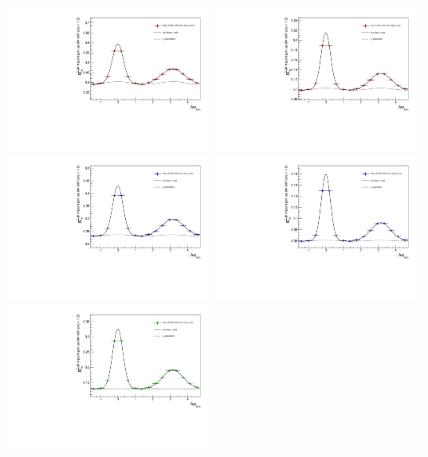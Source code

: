 \begin{figure}[ht]
    \centering
    \includegraphics[width=0.48\textwidth]{figures/analysis/h_h_dphi_von_0_20_lowpt.pdf}
    \includegraphics[width=0.48\textwidth]{figures/analysis/h_h_dphi_von_0_20_highpt.pdf}
    \includegraphics[width=0.48\textwidth]{figures/analysis/h_h_dphi_von_20_50_lowpt.pdf}
    \includegraphics[width=0.48\textwidth]{figures/analysis/h_h_dphi_von_20_50_highpt.pdf}
    \includegraphics[width=0.48\textwidth]{figures/analysis/h_h_dphi_von_50_80_lowpt.pdf}

\end{figure}

